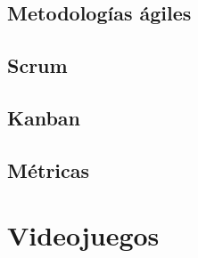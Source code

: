 \documentclass[12pt]{report}
\begin{document}
\section{Metodologías ágiles}


\section{Scrum}


\section{Kanban}


\section{Métricas}

% 
%
\chapter{Videojuegos}


% 
%
\printbibliography
\end{document}
